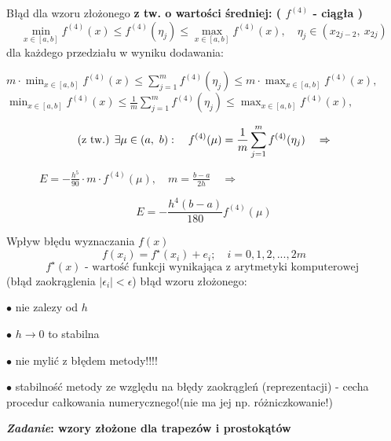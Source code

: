 	\begin{frame}{Błąd dla wzoru złożonego}
      \textbf{z tw. o wartości średniej: ( $f^{(4)}$ - ciągła )}
      $$
      \min_{x\in[a,b]}f^{(4)}(x)\leq f^{(4)}(\eta_{j})\leq \max_{x\in[a,b]}f^{(4)}(x) ,\quad \eta_{j}\in(x_{2j-2},\ x_{2j})
      $$
      \newline
	  dla każdego przedziału w wyniku dodawania:
      \begin{center}
        $\displaystyle
        m\cdot\min_{x\in[a,b]}f^{(4)}(x)\leq\sum_{j=1}^{m}f^{(4)}(\eta_{j})\leq m\cdot \max_{x\in[a,b]}f^{(4)}(x),
        $
        \newline
        $\displaystyle
        \min_{x\in[a,b]}f^{(4)}(x)\leq\frac{1}{m}\sum_{j=1}^{m}f^{(4)}(\eta_{j})\leq \max_{x\in[a,b]}f^{(4)}(x),
        $
      \end{center}
        
    \end{frame}
	\begin{frame}
      $$
      \textnormal{(z tw.) }\exists\mu\in(a,\ b) :\quad f^{(4)}(\mu)=\frac{1}{m}\sum_{j=1}^{m}f^{(4)}(\eta_{j}) \quad \Rightarrow
      $$

      $\displaystyle
      \qquad\quad E=-\frac{h^{5}}{90} \cdot m\cdot f^{(4)}(\mu) ,\quad m= \frac{b-a}{2h} \quad \Rightarrow
      $
      \begin{exampleblock}{}
      	\[
        	E=-\frac{h^{4}(b-a)}{180}f^{(4)}(\mu)
        \]
      \end{exampleblock}
    \end{frame}
	\begin{frame}{Wpływ błędu wyznaczania $f(x)$}
        $$
        f(x_{i})=f^{\star}(x_{i})+e_{i};\quad i=0, 1, 2, . . ., 2m
        $$
		$$
        f^{\star}(x) \textrm{ - wartość funkcji wynikająca z arytmetyki komputerowej }
        $$
        \newline
        (błąd zaokrąglenia $|\epsilon_{i}|<\epsilon$)
        \newline
		błąd wzoru złożonego:
        
        \quad $\bullet$ nie zalezy od $h$
        
		\quad $\bullet$ $h\rightarrow 0$ to stabilna
        
		\quad $\bullet$ nie mylić z błędem metody!!!!
        
		\quad $\bullet$ stabilność metody ze względu na błędy zaokrągleń (reprezentacji) - cecha procedur całkowania numerycznego!\newline (nie ma jej np. różniczkowanie!)\newline

		\textbf{{\it Zadanie}: wzory złożone dla trapezów i prostokątów}
        
    \end{frame}
